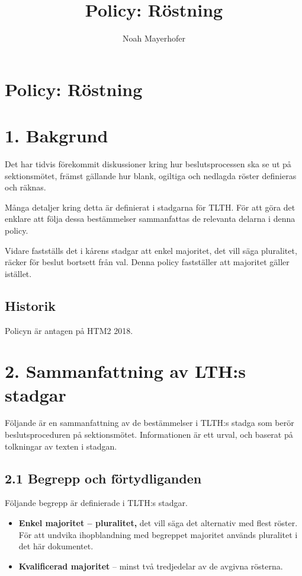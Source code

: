 \documentclass{dsekkallelse}
\title{Policy: Röstning}
\author{Noah Mayerhofer}
\begin{document}
\section{Policy: Röstning}

\section{1. Bakgrund}

Det har tidvis förekommit diskussioner kring hur beslutsprocessen ska se ut på sektionsmötet,
främst gällande hur blank, ogiltiga och nedlagda röster definieras och räknas.


Många detaljer kring detta är definierat i stadgarna för TLTH. För att göra det enklare att följa
dessa bestämmelser sammanfattas de relevanta delarna i denna policy.


Vidare fastställs det i kårens stadgar att enkel majoritet, det vill säga pluralitet, räcker för beslut
bortsett från val. Denna policy fastställer att majoritet gäller istället.

\subsection{Historik}
Policyn är antagen på HTM2 2018. 

\section{2. Sammanfattning av LTH:s stadgar}
Följande är en sammanfattning av de bestämmelser i TLTH:s stadga som berör beslutsproceduren på sektionsmötet. Informationen är ett urval, och baserat på tolkningar av texten i stadgan.

\subsection{2.1 Begrepp och förtydliganden}

Följande begrepp är definierade i TLTH:s stadgar.

\begin{itemize}
	\item \textbf{ Enkel majoritet – pluralitet,} det vill säga det alternativ med flest röster. För att undvika
ihopblandning med begreppet majoritet används pluralitet i det här dokumentet.
\item \textbf{Kvalificerad majoritet} – minst två tredjedelar av de avgivna rösterna.

\end{itemize} 
\end{document}
